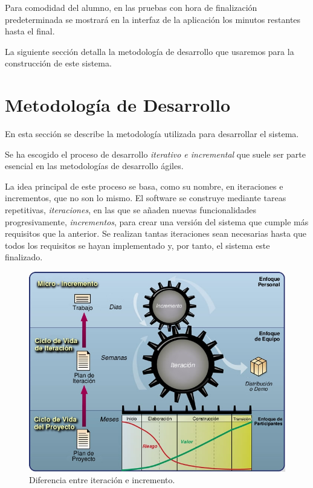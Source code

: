 Para comodidad del alumno, en las pruebas con hora de finalización predeterminada se mostrará en la interfaz de la aplicación los minutos restantes hasta el final.
\newline


La siguiente sección detalla la metodología de desarrollo que usaremos para la construcción de este sistema.

\section{Metodología de Desarrollo}
\label{sec:planificacion:metodologia}

En esta sección se describe la metodología utilizada para desarrollar el sistema.
\newline

Se ha escogido el proceso de desarrollo \emph{iterativo e incremental} que suele ser parte esencial en las metodologías de desarrollo ágiles\cite{AGIL:2003}.
\newline

La idea principal de este proceso se basa, como su nombre, en iteraciones e incrementos, que no son lo mismo.
El software se construye mediante tareas repetitivas, \emph{iteraciones}, en las que se añaden nuevas funcionalidades progresivamente, \emph{incrementos}, para crear una versión del sistema que cumple más requisitos que la anterior. Se realizan tantas iteraciones sean necesarias hasta que todos los requisitos se hayan implementado y, por tanto, el sistema este finalizado.
\newline


\begin{figure}
    \centering
    \includegraphics[width=\linewidth]{planificacion/iteracionIncremento}
    \caption{Diferencia entre iteración e incremento.\cite{UP:2006}}
    \label{fig:planificacion:iteracionIncremento}
\end{figure}

